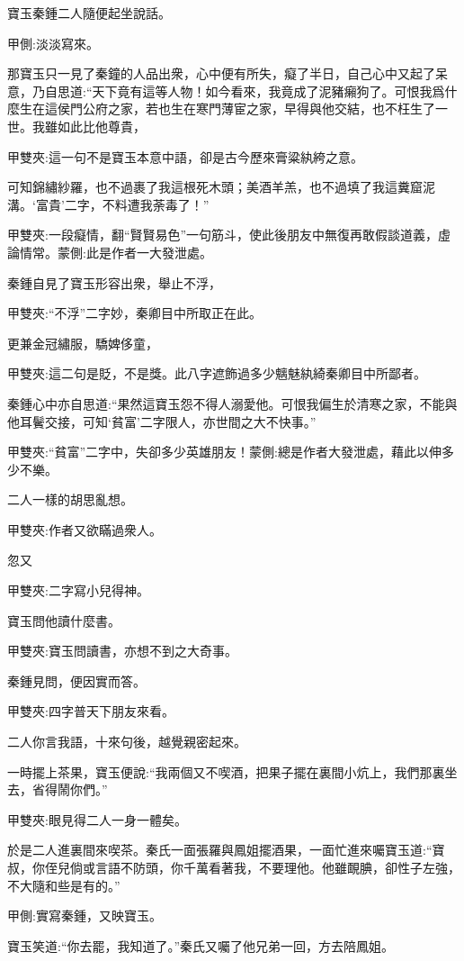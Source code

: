 \begin{parag}
    寶玉秦鍾二人隨便起坐說話。\begin{note}甲側:淡淡寫來。\end{note}那寶玉只一見了秦鐘的人品出衆，心中便有所失，癡了半日，自己心中又起了呆意，乃自思道:“天下竟有這等人物！如今看來，我竟成了泥豬癩狗了。可恨我爲什麼生在這侯門公府之家，若也生在寒門薄宦之家，早得與他交結，也不枉生了一世。我雖如此比他尊貴，\begin{note}甲雙夾:這一句不是寶玉本意中語，卻是古今歷來膏粱紈絝之意。\end{note}可知錦繡紗羅，也不過裹了我這根死木頭；美酒羊羔，也不過填了我這糞窟泥溝。‘富貴’二字，不料遭我荼毒了！”\begin{note}甲雙夾:一段癡情，翻“賢賢易色”一句筋斗，使此後朋友中無復再敢假談道義，虛論情常。蒙側:此是作者一大發泄處。\end{note}秦鍾自見了寶玉形容出衆，舉止不浮，\begin{note}甲雙夾:“不浮”二字妙，秦卿目中所取正在此。\end{note}更兼金冠繡服，驕婢侈童，\begin{note}甲雙夾:這二句是貶，不是獎。此八字遮飾過多少魑魅紈綺秦卿目中所鄙者。\end{note}秦鍾心中亦自思道:“果然這寶玉怨不得人溺愛他。可恨我偏生於清寒之家，不能與他耳鬢交接，可知‘貧富’二字限人，亦世間之大不快事。”\begin{note}甲雙夾:“貧富”二字中，失卻多少英雄朋友！蒙側:總是作者大發泄處，藉此以伸多少不樂。\end{note}二人一樣的胡思亂想。\begin{note}甲雙夾:作者又欲瞞過衆人。\end{note}忽又\begin{note}甲雙夾:二字寫小兒得神。\end{note}寶玉問他讀什麼書。\begin{note}甲雙夾:寶玉問讀書，亦想不到之大奇事。\end{note}秦鍾見問，便因實而答。\begin{note}甲雙夾:四字普天下朋友來看。\end{note}二人你言我語，十來句後，越覺親密起來。
\end{parag}


\begin{parag}
    一時擺上茶果，寶玉便說:“我兩個又不喫酒，把果子擺在裏間小炕上，我們那裏坐去，省得鬧你們。”\begin{note}甲雙夾:眼見得二人一身一體矣。\end{note}於是二人進裏間來喫茶。秦氏一面張羅與鳳姐擺酒果，一面忙進來囑寶玉道:“寶叔，你侄兒倘或言語不防頭，你千萬看著我，不要理他。他雖靦腆，卻性子左強，不大隨和些是有的。”\begin{note}甲側:實寫秦鍾，又映寶玉。\end{note}寶玉笑道:“你去罷，我知道了。”秦氏又囑了他兄弟一回，方去陪鳳姐。
\end{parag}


